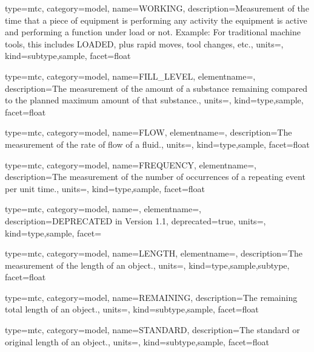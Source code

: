{
  type=mtc,
  category=model,
  name={WORKING},
  description={Measurement of the time that a piece of equipment is performing any activity  the equipment is active and performing a function under load or not. \newline Example: For traditional machine tools, this includes LOADED, plus rapid moves, tool changes, etc.},
  units=,
  kind={subtype,sample},
  facet={\gls{float}}
}


{
  type=mtc,
  category=model,
  name={FILL\_LEVEL},
  elementname=,
  description={The measurement of the amount of a substance remaining compared to the planned maximum amount of that substance.},
  units=,
  kind={type,sample},
  facet={\gls{float}}
}


{
  type=mtc,
  category=model,
  name={FLOW},
  elementname=,
  description={The measurement of the rate of flow of a fluid.},
  units=,
  kind={type,sample},
  facet={\gls{float}}
}


{
  type=mtc,
  category=model,
  name={FREQUENCY},
  elementname=,
  description={The measurement of the number of occurrences of a repeating event per unit time.},
  units=,
  kind={type,sample},
  facet={\gls{float}}
}


{
  type=mtc,
  category=model,
  name=,
  elementname=,
  description={DEPRECATED in Version 1.1},
  deprecated={true},
  units={},
  kind={type,sample},
  facet={}
}


{
  type=mtc,
  category=model,
  name={LENGTH},
  elementname=,
  description={The measurement of the length of an object.},
  units=,
  kind={type,sample,subtype},
  facet={\gls{float}}
}


{
  type=mtc,
  category=model,
  name={REMAINING},
  description={The remaining total length of an object.},
  units=,
  kind={subtype,sample},
  facet={\gls{float}}
}


{
  type=mtc,
  category=model,
  name={STANDARD},
  description={The standard or original length of an object.},
  units=,
  kind={subtype,sample},
  facet={\gls{float}}
}


